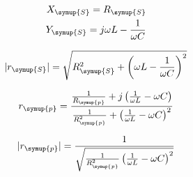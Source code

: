     \begin{align}
        X_{\symup{S}} = R_{\symup{S}}  \nonumber\\ 
        Y_{\symup{S}} = j \omega L - \frac{1}{\omega C} \nonumber
    \end{align}

    \begin{equation}
        |r_{\symup{S}}| = \sqrt{R^2_{\symup{S}} + \left( \omega L - \frac{1}{\omega C} \right)^2} \nonumber
    \end{equation}

    \begin{equation}
        r_{\symup{p}} = \frac{\frac{1}{R_{\symup{p}}}+j \left( \frac{1}{\omega L} - \omega C \right)}{\frac{1}{R^2_{\symup{p}}}+ \left( \frac{1}{\omega L} - \omega C \right)^2} \nonumber
    \end{equation}

    \begin{equation}
        |r_{\symup{p}}|=  \frac{1}{\sqrt{\frac{1}{R^2_{\symup{p}}} \left( \frac{1}{\omega L} - \omega C \right)^2}} \nonumber
    \end{equation}
